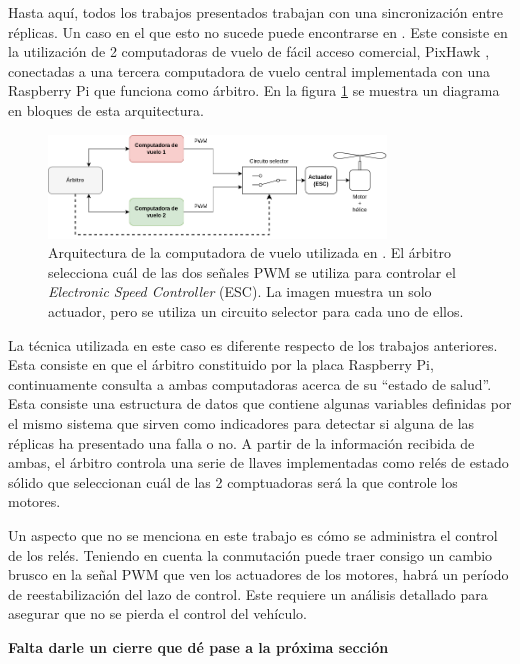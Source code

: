 Hasta aquí, todos los trabajos presentados trabajan con una sincronización entre réplicas. Un caso en el que esto no sucede puede encontrarse en \cite{thesis_redundant_ROS}. Este consiste en la utilización de 2 computadoras de vuelo de fácil acceso comercial, PixHawk \cite{dronecode-foundation-2023}, conectadas a una tercera computadora de vuelo central implementada con una Raspberry Pi que funciona como árbitro. En la figura \ref{fig:ROS_redundancy} se muestra un diagrama en bloques de esta arquitectura.

\begin{figure}[H]
    \centering
    \includegraphics[width=0.8\textwidth]{img/ROS_redundancy.png}
    \caption{Arquitectura de la computadora de vuelo utilizada en \cite{thesis_redundant_ROS}. El árbitro selecciona cuál de las dos señales PWM se utiliza para controlar el \textit{Electronic Speed Controller} (ESC). La imagen muestra un solo actuador, pero se utiliza un circuito selector para cada uno de ellos.}
    \label{fig:ROS_redundancy}
\end{figure}

La técnica utilizada en este caso es diferente respecto de los trabajos anteriores. Esta consiste en que el árbitro constituido por la placa Raspberry Pi, continuamente consulta a ambas computadoras acerca de su ``estado de salud''. Esta consiste una estructura de datos que contiene algunas variables definidas por el mismo sistema que sirven como indicadores para detectar si alguna de las réplicas ha presentado una falla o no. A partir de la información recibida de ambas, el árbitro controla una serie de llaves implementadas como relés de estado sólido que seleccionan cuál de las 2 comptuadoras será la que controle los motores.

Un aspecto que no se menciona en este trabajo es cómo se administra el control de los relés. Teniendo en cuenta la conmutación puede traer consigo un cambio brusco en la señal PWM que ven los actuadores de los motores, habrá un período de reestabilización del lazo de control. Este requiere un análisis detallado para asegurar que no se pierda el control del vehículo.




\textbf{{\color{red} Falta darle un cierre que dé pase a la próxima sección}}